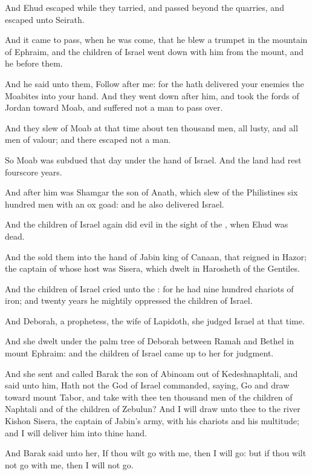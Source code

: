 \Verse And Ehud escaped while they tarried, and passed beyond the quarries, and escaped unto Seirath.

\Verse And it came to pass, when he was come, that he blew a trumpet in the mountain of Ephraim, and the children of Israel went down with him from the mount, and he before them.

\Verse And he said unto them, Follow after me: for the \LORD hath delivered your enemies the Moabites into your hand. And they went down after him, and took the fords of Jordan toward Moab, and suffered not a man to pass over.

\Verse And they slew of Moab at that time about ten thousand men, all lusty, and all men of valour; and there escaped not a man.

\Verse So Moab was subdued that day under the hand of Israel. And the land had rest fourscore years.

\Verse And after him was Shamgar the son of Anath, which slew of the Philistines six hundred men with an ox goad: and he also delivered Israel.


\Chapter
\Verse And the children of Israel again did evil in the sight of the \LORD, when Ehud was dead.

\Verse And the \LORD sold them into the hand of Jabin king of Canaan, that reigned in Hazor; the captain of whose host was Sisera, which dwelt in Harosheth of the Gentiles.

\Verse And the children of Israel cried unto the \LORD: for he had nine hundred chariots of iron; and twenty years he mightily oppressed the children of Israel.

\Verse And Deborah, a prophetess, the wife of Lapidoth, she judged Israel at that time.

\Verse And she dwelt under the palm tree of Deborah between Ramah and Bethel in mount Ephraim: and the children of Israel came up to her for judgment.

\Verse And she sent and called Barak the son of Abinoam out of Kedeshnaphtali, and said unto him, Hath not the \LORD God of Israel commanded, saying, Go and draw toward mount Tabor, and take with thee ten thousand men of the children of Naphtali and of the children of Zebulun?  \Verse And I will draw unto thee to the river Kishon Sisera, the captain of Jabin's army, with his chariots and his multitude; and I will deliver him into thine hand.

\Verse And Barak said unto her, If thou wilt go with me, then I will go: but if thou wilt not go with me, then I will not go.

